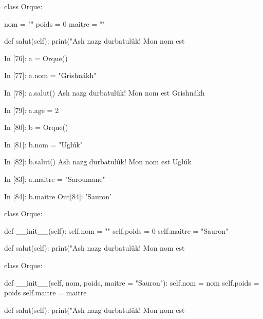 \documentclass[french]{beamer}
\begin{document}
\begin{frame}[fragile]
  \begin{pythoncode}
class Orque:

    nom    = ""
    poids  = 0
    maitre = ""

    def salut(self):
        print("Ash nazg durbatulûk! Mon nom est %
\end{pythoncode}


  
\end{frame}




\begin{frame}[fragile]
\begin{pythoncode}
In [76]: a = Orque()

In [77]: a.nom = "Grishnákh"

In [78]: a.salut()
Ash nazg durbatulûk! Mon nom est Grishnákh

In [79]: a.age = 2

In [80]: b = Orque()

In [81]: b.nom = "Uglúk"

In [82]: b.salut()
Ash nazg durbatulûk! Mon nom est Uglúk

In [83]: a.maitre = "Saroumane"

In [84]: b.maitre
Out[84]: 'Sauron'
\end{pythoncode}


\end{frame}



\begin{frame}[fragile]
  \begin{pythoncode}
class Orque:

    def __init__(self):
        self.nom    = ""
        self.poids  = 0
        self.maitre = "Sauron"

    def salut(self):
        print("Ash nazg durbatulûk! Mon nom est %
\end{pythoncode}


  
\end{frame}



\begin{frame}[fragile]
  \begin{pythoncode}
class Orque:

    def __init__(self, nom, poids, maitre = "Sauron"):
        self.nom    = nom
        self.poids  = poids
        self.maitre = maitre

    def salut(self):
        print("Ash nazg durbatulûk! Mon nom est %
\end{pythoncode}


  
\end{frame}
\end{document}
